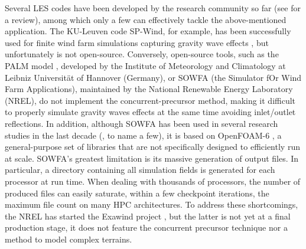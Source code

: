 \documentclass[journal abbreviation, manuscript]{copernicus}
\begin{document}
Several LES codes have been developed by the research community so far (see \citealp{2017_BretonEtAl} for a review), among which only a few can effectively tackle the above-mentioned application. The KU-Leuven code SP-Wind, for example, has been successfully used for finite wind farm simulations capturing gravity wave effects \citep{2022b_LanzilaoMeyers}, but unfortunately is not open-source. Conversely, open-source tools, such as the PALM model \citep{2015_MarongaEtAl}, developed by the Institute of Meteorology and Climatology at Leibniz Universität of Hannover (Germany), or SOWFA (the Simulator fOr Wind Farm Applications), maintained by the National Renewable Energy Laboratory (NREL), do not implement the concurrent-precursor method, making it difficult to properly simulate gravity waves effects at the same time avoiding inlet/outlet reflections. In addition, although SOWFA has been used in several research studies in the last decade (\citealp{2012a_ChurchfieldEtAl,2012b_ChurchfieldEtAl,2014_FlemingEtAl, 2021_TossasEtAl}, to name a few), it is based on OpenFOAM-6 \citep{OpenFoam6}, a general-purpose set of libraries that are not specifically designed to efficiently run at scale. SOWFA's greatest limitation is its massive generation of output files. In particular, a directory containing all simulation fields is generated for each processor at run time. When dealing with thousands of processors, the number of produced files can easily saturate, within a few checkpoint iterations, the maximum file count on many HPC architectures. To address these shortcomings, the NREL has started the Exawind project \citep{2022_Min}, but the latter is not yet at a final production stage, it does not feature the concurrent precursor technique nor a method to model complex terrains.\\
\end{document}
